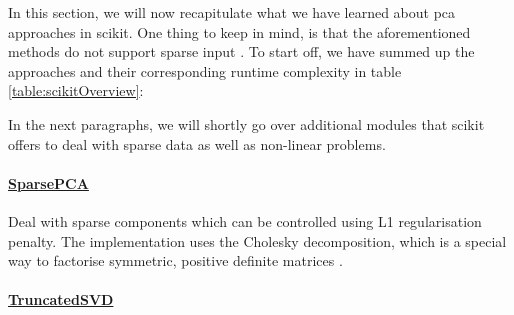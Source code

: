 In this section, we will now recapitulate what we have learned about \acrlong{pca} approaches in \gls{scikit}.
One thing to keep in mind, is that the aforementioned methods do not support sparse input \cite{scikit-learn}.
To start off, we have summed up the approaches and their corresponding runtime complexity in table \ref{table:scikitOverview}:

\begin{table}[h]
	\centering
	\caption{Overview of \gls{scikit}'s \gls{pca} implementations}
	\label{table:scikitOverview}
\end{table}
\medskip



In the next paragraphs, we will shortly go over additional modules that \gls{scikit} offers to deal with sparse data as well as non-linear problems.

\paragraph{\href{https://scikit-learn.org/stable/modules/generated/sklearn.decomposition.SparsePCA.html\#sklearn.decomposition.SparsePCA}{%
%
SparsePCA%
}}

Deal with sparse components which can be controlled using L1 regularisation penalty.
The implementation uses the Cholesky decomposition, which is a special way to factorise symmetric, positive definite matrices \cite{deisenroth2020mathematics}.


\paragraph{\href{https://scikit-learn.org/stable/modules/generated/sklearn.decomposition.TruncatedSVD.html\#sklearn.decomposition.TruncatedSVD}{%
%
TruncatedSVD%
}}

